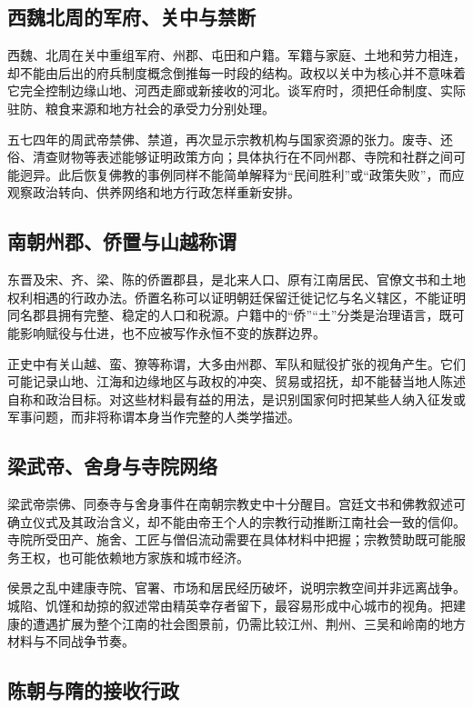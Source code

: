 \subsection{西魏北周的军府、关中与禁断}

西魏、北周在关中重组军府、州郡、屯田和户籍。军籍与家庭、土地和劳力相连，却不能由后出的府兵制度概念倒推每一时段的结构。政权以关中为核心并不意味着它完全控制边缘山地、河西走廊或新接收的河北。谈军府时，须把任命制度、实际驻防、粮食来源和地方社会的承受力分别处理。

五七四年的周武帝禁佛、禁道，再次显示宗教机构与国家资源的张力。废寺、还俗、清查财物等表述能够证明政策方向；具体执行在不同州郡、寺院和社群之间可能迥异。此后恢复佛教的事例同样不能简单解释为“民间胜利”或“政策失败”，而应观察政治转向、供养网络和地方行政怎样重新安排。

\subsection{南朝州郡、侨置与山越称谓}

东晋及宋、齐、梁、陈的侨置郡县，是北来人口、原有江南居民、官僚文书和土地权利相遇的行政办法。侨置名称可以证明朝廷保留迁徙记忆与名义辖区，不能证明同名郡县拥有完整、稳定的人口和税源。户籍中的“侨”“土”分类是治理语言，既可能影响赋役与仕进，也不应被写作永恒不变的族群边界。

正史中有关山越、蛮、獠等称谓，大多由州郡、军队和赋役扩张的视角产生。它们可能记录山地、江海和边缘地区与政权的冲突、贸易或招抚，却不能替当地人陈述自称和政治目标。对这些材料最有益的用法，是识别国家何时把某些人纳入征发或军事问题，而非将称谓本身当作完整的人类学描述。

\subsection{梁武帝、舍身与寺院网络}

梁武帝崇佛、同泰寺与舍身事件在南朝宗教史中十分醒目。宫廷文书和佛教叙述可确立仪式及其政治含义，却不能由帝王个人的宗教行动推断江南社会一致的信仰。寺院所受田产、施舍、工匠与僧侣流动需要在具体材料中把握；宗教赞助既可能服务王权，也可能依赖地方家族和城市经济。

侯景之乱中建康寺院、官署、市场和居民经历破坏，说明宗教空间并非远离战争。城陷、饥馑和劫掠的叙述常由精英幸存者留下，最容易形成中心城市的视角。把建康的遭遇扩展为整个江南的社会图景前，仍需比较江州、荆州、三吴和岭南的地方材料与不同战争节奏。

\subsection{陈朝与隋的接收行政}

